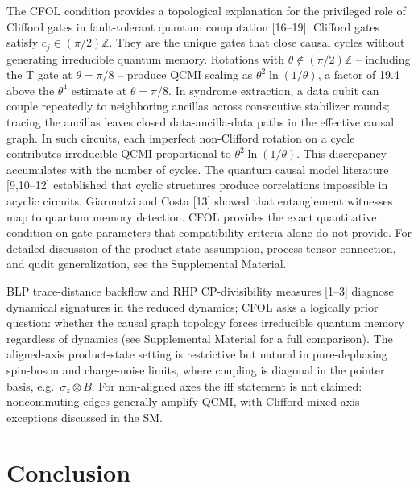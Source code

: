 \documentclass[twocolumn,aps,prl,floatfix]{revtex4-2}
\begin{document}
The CFOL condition provides a topological explanation for the privileged role of Clifford gates in fault-tolerant quantum computation [16--19]. Clifford gates satisfy $c_j\in(\pi/2)\mathbb{Z}$. They are the unique gates that close causal cycles without generating irreducible quantum memory. Rotations with $\theta\notin(\pi/2)\mathbb{Z}$ -- including the T gate at $\theta=\pi/8$ -- produce QCMI scaling as $\theta^2\ln(1/\theta)$, a factor of 19.4 above the $\theta^4$ estimate at $\theta=\pi/8$. In syndrome extraction, a data qubit can couple repeatedly to neighboring ancillas across consecutive stabilizer rounds; tracing the ancillas leaves closed data-ancilla-data paths in the effective causal graph. In such circuits, each imperfect non-Clifford rotation on a cycle contributes irreducible QCMI proportional to $\theta^2\ln(1/\theta)$. This discrepancy accumulates with the number of cycles. The quantum causal model literature [9,10--12] established that cyclic structures produce correlations impossible in acyclic circuits. Giarmatzi and Costa [13] showed that entanglement witnesses map to quantum memory detection. CFOL provides the exact quantitative condition on gate parameters that compatibility criteria alone do not provide. For detailed discussion of the product-state assumption, process tensor connection, and qudit generalization, see the Supplemental Material.

BLP trace-distance backflow and RHP CP-divisibility measures [1--3] diagnose dynamical signatures in the reduced dynamics; CFOL asks a logically prior question: whether the causal graph topology forces irreducible quantum memory regardless of dynamics (see Supplemental Material for a full comparison). The aligned-axis product-state setting is restrictive but natural in pure-dephasing spin-boson and charge-noise limits, where coupling is diagonal in the pointer basis, e.g.\ $\sigma_z\otimes B$. For non-aligned axes the iff statement is not claimed: noncommuting edges generally amplify QCMI, with Clifford mixed-axis exceptions discussed in the SM.

\section{Conclusion}
\end{document}
